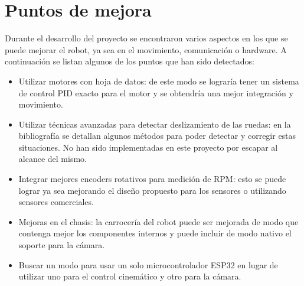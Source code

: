 \section{Puntos de mejora}

Durante el desarrollo del proyecto se encontraron varios aspectos en los que se puede mejorar el robot, ya sea en el movimiento, comunicación o hardware. A continuación se listan algunos de los puntos que han sido detectados:

\begin{itemize}
    \item Utilizar motores con hoja de datos: de este modo se lograría tener un sistema de control PID exacto para el motor y se obtendría una mejor integración y movimiento.

    \item Utilizar técnicas avanzadas para detectar deslizamiento de las ruedas: en la bibliografía \cite{phunopasomnirobot} \cite{palacinodometry} se detallan algunos métodos para poder detectar y corregir estas situaciones. No han sido implementadas en este proyecto por escapar al alcance del mismo.
    
    \item Integrar mejores encoders rotativos para medición de RPM: esto se puede lograr ya sea mejorando el diseño propuesto para los sensores o utilizando sensores comerciales.
    
    \item Mejoras en el chasis: la carrocería del robot puede ser mejorada de modo que contenga mejor los componentes internos y puede incluir de modo nativo el soporte para la cámara.
    
    \item Buscar un modo para usar un solo microcontrolador ESP32 en lugar de utilizar uno para el control cinemático y otro para la cámara.
\end{itemize}

